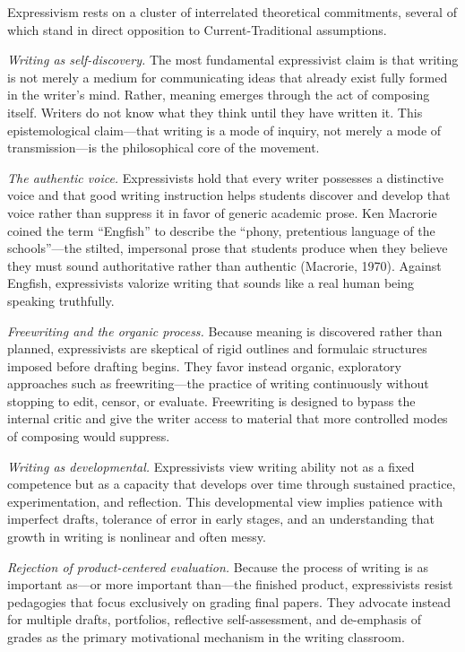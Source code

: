 \documentclass[12pt]{article}
\begin{document}
Expressivism rests on a cluster of interrelated theoretical commitments, several of which stand in direct opposition to Current-Traditional assumptions.

\textit{Writing as self-discovery.} The most fundamental expressivist claim is that writing is not merely a medium for communicating ideas that already exist fully formed in the writer's mind. Rather, meaning emerges through the act of composing itself. Writers do not know what they think until they have written it. This epistemological claim---that writing is a mode of inquiry, not merely a mode of transmission---is the philosophical core of the movement.

\textit{The authentic voice.} Expressivists hold that every writer possesses a distinctive voice and that good writing instruction helps students discover and develop that voice rather than suppress it in favor of generic academic prose. Ken Macrorie coined the term ``Engfish'' to describe the ``phony, pretentious language of the schools''---the stilted, impersonal prose that students produce when they believe they must sound authoritative rather than authentic (Macrorie, 1970). Against Engfish, expressivists valorize writing that sounds like a real human being speaking truthfully.

\textit{Freewriting and the organic process.} Because meaning is discovered rather than planned, expressivists are skeptical of rigid outlines and formulaic structures imposed before drafting begins. They favor instead organic, exploratory approaches such as freewriting---the practice of writing continuously without stopping to edit, censor, or evaluate. Freewriting is designed to bypass the internal critic and give the writer access to material that more controlled modes of composing would suppress.

\textit{Writing as developmental.} Expressivists view writing ability not as a fixed competence but as a capacity that develops over time through sustained practice, experimentation, and reflection. This developmental view implies patience with imperfect drafts, tolerance of error in early stages, and an understanding that growth in writing is nonlinear and often messy.

\textit{Rejection of product-centered evaluation.} Because the process of writing is as important as---or more important than---the finished product, expressivists resist pedagogies that focus exclusively on grading final papers. They advocate instead for multiple drafts, portfolios, reflective self-assessment, and de-emphasis of grades as the primary motivational mechanism in the writing classroom.
\end{document}
